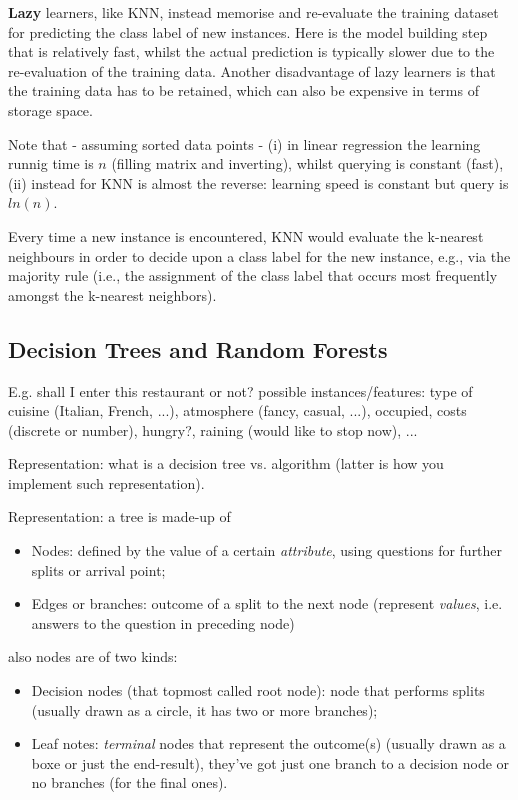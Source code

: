 \documentclass[11pt]{article}
\begin{document}
\textbf{Lazy} learners, like KNN, instead memorise and re-evaluate the training dataset for predicting the class label of new instances. Here is the model building step that is relatively fast, whilst the actual prediction is typically slower due to the re-evaluation of the training data. Another disadvantage of lazy learners is that the training data has to be retained, which can also be expensive in terms of storage space.

Note that - assuming sorted data points - (i) in linear regression the learning runnig time is $n$ (filling matrix and inverting), whilst querying is constant (fast), (ii) instead for KNN is almost the reverse: learning speed is constant but query is $ln(n)$. 

Every time a new instance is encountered, KNN would evaluate the k-nearest neighbours in order to decide upon a class label for the new instance, e.g., via the majority rule (i.e., the assignment of the class label that occurs most frequently amongst the k-nearest neighbors).

\subsection{Decision Trees and Random Forests}
E.g. shall I enter this restaurant or not? possible instances/features: type of cuisine (Italian, French, ...), atmosphere (fancy, casual, ...), occupied, costs (discrete or number), hungry?, raining (would like to stop now), ... 

Representation: what is a decision tree vs. algorithm (latter is how you implement such representation).

Representation: a tree is made-up of
\begin{itemize}
	\item Nodes: defined by the value of a certain \textit{attribute}, using questions for further splits or arrival point; 
	\item Edges or branches: outcome of a split to the next node (represent \textit{values}, i.e. answers to the question in preceding node)
\end{itemize}
also nodes are of two kinds:
\begin{itemize}
	\item Decision nodes (that topmost called root node): node that performs splits (usually drawn as a circle, it has two or more branches);
	\item Leaf notes: \textit{terminal} nodes that represent the outcome(s) (usually drawn as a boxe or just the end-result), they've got just one branch to a decision node or no branches (for the final ones).
\end{itemize}
\end{document}
